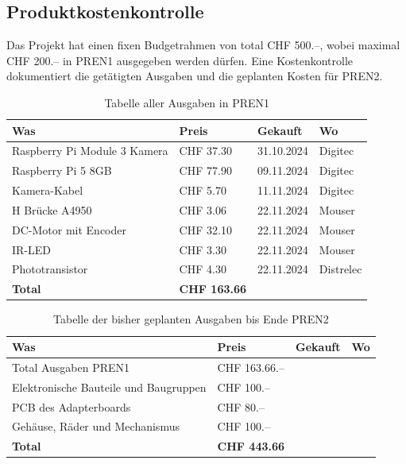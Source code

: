 \documentclass[../main.tex]{subfiles}
\begin{document}
\subsection{Produktkostenkontrolle}
Das Projekt hat einen fixen Budgetrahmen von total CHF 500.--, wobei maximal CHF 200.-- in PREN1 ausgegeben werden dürfen. Eine Kostenkontrolle dokumentiert die getätigten Ausgaben und die geplanten Kosten für PREN2.
\begin{table}[H]
\begin{tabular}{|p{6cm}|p{2.5cm}|p{2cm}|p{2.5cm}|}
\hline
\textbf{Was} & \textbf{Preis} & \textbf{Gekauft} & \textbf{Wo} \\ \hline
Raspberry Pi Module 3 Kamera & CHF 37.30 & 31.10.2024 & Digitec \\ \hline
Raspberry Pi 5 8GB & CHF 77.90 & 09.11.2024 & Digitec \\ \hline
Kamera-Kabel & CHF 5.70 & 11.11.2024 & Digitec \\ \hline
H Brücke A4950 & CHF 3.06 & 22.11.2024 & Mouser \\ \hline
DC-Motor mit Encoder & CHF 32.10 & 22.11.2024 & Mouser \\ \hline
IR-LED & CHF 3.30 & 22.11.2024 & Mouser \\ \hline
Phototransistor & CHF 4.30 & 22.11.2024 & Distrelec \\ \hline
\hline
\textbf{Total} & \textbf{CHF 163.66} & & \\ \hline
\end{tabular}
\caption{Tabelle aller Ausgaben in PREN1}
\label{tab:ausgaben_pren1}
\end{table}

\begin{table}[H]
\begin{tabular}{|p{6cm}|p{2.5cm}|p{2cm}|p{2.5cm}|}
\hline
\textbf{Was} & \textbf{Preis} & \textbf{Gekauft} & \textbf{Wo} \\ \hline
Total Ausgaben PREN1 & CHF 163.66.-- &  &  \\ \hline
Elektronische Bauteile und Baugruppen & CHF 100.-- &  &  \\ \hline
PCB des Adapterboards & CHF 80.-- &  &  \\ \hline
Gehäuse, Räder und Mechanismus & CHF 100.-- &  &  \\ \hline
\hline
\textbf{Total} & \textbf{CHF 443.66} & & \\ \hline
\end{tabular}
\caption{Tabelle der bisher geplanten Ausgaben bis Ende PREN2}
\label{tab:ausgaben_pren2}
\end{table}
\end{document}
